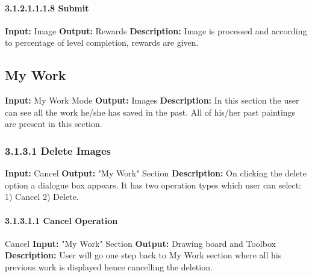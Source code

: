\documentclass{scrreprt}
\begin{document}
\paragraph{3.1.2.1.1.1.8 Submit}
\hfill \vspace{2.5mm} \break 
\textbf{Input:} Image \newline
\textbf{Output:} Rewards
\vspace{1mm}\newline
\textbf{Description:} \newline 
Image is processed and according to percentage of level completion, rewards are given.

\subsection{My Work}
\textbf{Input:} My Work Mode \newline
\textbf{Output:} Images
\vspace{1mm}\newline
\textbf{Description:} \newline 
In this section the user can see all the work he/she has saved in the past. All of his/her past paintings are present in this section. 

\subsubsection{3.1.3.1 Delete Images}
\textbf{Input:} Cancel \newline
\textbf{Output:} "My Work" Section
\vspace{1mm}\newline
\textbf{Description:} \newline 
On clicking the delete option a dialogue box appears. It has two operation types which user can select: 1) Cancel  2) Delete.

\paragraph{3.1.3.1.1 Cancel Operation}
\hfill \vspace{2.5mm} Cancel\break 
\textbf{Input:} "My Work" Section \newline
\textbf{Output:} Drawing board and Toolbox
\vspace{1mm}\newline
\textbf{Description:} \newline 
User will go one step back to My Work section where all his previous work is displayed hence cancelling the deletion.
\end{document}
